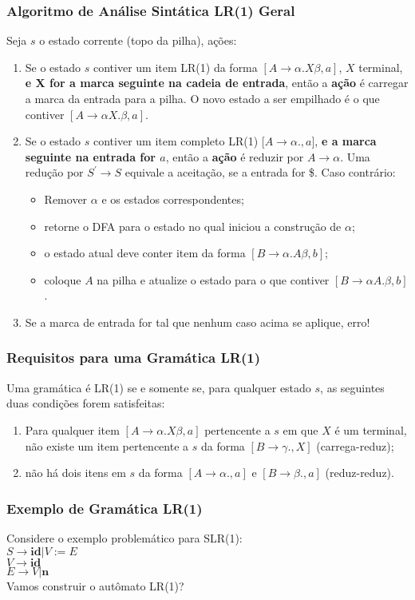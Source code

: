 \documentclass[table]{beamer}
\begin{document}
\begin{frame}
   \frametitle{Algoritmo de Análise Sintática LR(1) Geral}
   Seja $s$ o estado corrente (topo da pilha), ações:
   \begin{enumerate}
      \item Se o estado $s$ contiver um item LR(1) da forma $[A\to\alpha.X\beta, a]$, $X$ terminal, \textbf{e X for a marca seguinte na cadeia de entrada}, então a \textbf{ação} é carregar a marca da entrada para a pilha. O novo estado a ser empilhado é o que contiver $[A\to\alpha X.\beta,a]$.
      \item Se o estado $s$ contiver um item completo LR(1) [$A\to\alpha.,a]$, \textbf{e a marca seguinte na entrada for $a$}, então a \textbf{ação} é reduzir por $A\to\alpha$. Uma redução por $S^{'}\to S$ equivale a aceitação, se a entrada for \$. Caso contrário:
      \begin{itemize}
         \item Remover $\alpha$ e os estados correspondentes;
	 \item retorne o DFA para o estado no qual iniciou a construção de $\alpha$;
	 \item o estado atual deve conter item da forma $[B\to\alpha.A\beta, b]$;
	 \item coloque $A$ na pilha e atualize o estado para o que contiver $[B\to\alpha A.\beta, b]$.
      \end{itemize}
      \item Se a marca de entrada for tal que nenhum caso acima se aplique, erro!
   \end{enumerate}
\end{frame}

\begin{frame}
   \frametitle{Requisitos para uma Gramática LR(1)}
   Uma gramática é LR(1) se e somente se, para qualquer estado $s$, as seguintes duas condições forem satisfeitas:
   \begin{enumerate}
      \item Para qualquer item $[A\to\alpha.X\beta, a]$ pertencente a $s$ em que $X$ é um terminal, não existe um item pertencente a $s$ da forma $[B\to\gamma.,X]$ (carrega-reduz);
      \item não há dois itens em $s$ da forma $[A\to\alpha.,a]$ e $[B\to\beta., a]$ (reduz-reduz).
   \end{enumerate}
\end{frame}

\begin{frame}
   \frametitle{Exemplo de Gramática LR(1)}
   Considere o exemplo problemático para SLR(1): \\
   $S \to \textbf{id}|V:=E$ \\
   $V \to \textbf{id}$ \\
   $E \to V|\textbf{n}$ \\
   Vamos construir o autômato LR(1)?
\end{frame}
\end{document}

